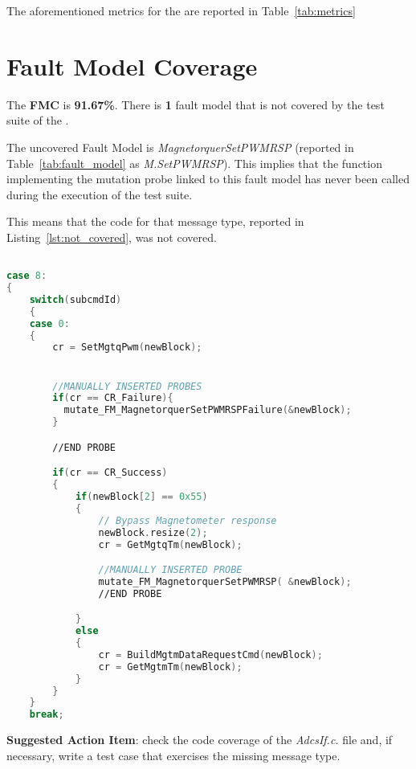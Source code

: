 The aforementioned metrics for the \case are reported in Table~\ref{tab:metrics}




\section{Fault Model Coverage}

The \textbf{FMC} is \textbf{91.67\%}. There is \textbf{1} fault model that is not covered by the test suite of the \case.

The uncovered Fault Model is \emph{MagnetorquerSetPWMRSP} (reported in Table~\ref{tab:fault_model} as \emph{M.SetPWMRSP}). This implies that the function implementing the mutation probe linked to this fault model has never been called during the execution of the test suite.

This means that the code for that message type, reported in Listing~\ref{lst:not_covered}, was not covered.


\begin{lstlisting}[language=C++, caption=Uncovered portion of source code, label={lst:not_covered}]

case 8:
{
    switch(subcmdId)
    {
    case 0:
    {
        cr = SetMgtqPwm(newBlock);


        //MANUALLY INSERTED PROBES
        if(cr == CR_Failure){
          mutate_FM_MagnetorquerSetPWMRSPFailure(&newBlock);
        }

        //END PROBE

        if(cr == CR_Success)
        {
            if(newBlock[2] == 0x55)
            {
                // Bypass Magnetometer response
                newBlock.resize(2);
                cr = GetMgtqTm(newBlock);

                //MANUALLY INSERTED PROBE
                mutate_FM_MagnetorquerSetPWMRSP( &newBlock);
                //END PROBE

            }
            else
            {
                cr = BuildMgtmDataRequestCmd(newBlock);
                cr = GetMgtmTm(newBlock);
            }
        }
    }
    break;


\end{lstlisting}

\textbf{Suggested Action Item}: check the code coverage of the \emph{AdcsIf.c.} file and, if necessary, write a test case that exercises the missing message type.

